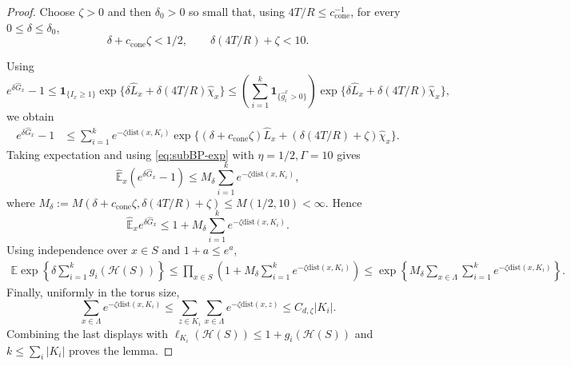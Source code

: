 \documentclass[letterpaper,11pt,reqno]{amsart}
\theoremstyle{definition}
\newcommand{\dist}{\mathrm{dist}}
\begin{document}
\begin{proof}
Choose \(\zeta>0\) and then \(\delta_0>0\) so small that, using
\(4T/R\le c_{\mathrm{cone}}^{-1}\), for every
\(0\le\delta\le\delta_0\),
\[
        \delta+c_{\mathrm{cone}}\zeta<1/2,
        \qquad
        \delta(4T/R)+\zeta<10 .
\]

Using
\[
        e^{\delta\widehat G_x}-1
        \le
        \mathbf 1_{\{I_x\ge1\}}
        \exp\{\delta\widehat L_x+\delta(4T/R)\widehat\chi_x\}
        \le
        \left(\sum_{i=1}^{k}\mathbf  1_{\{\widehat g_i^x>0\}}\right)
        \exp\{\delta\widehat L_x+\delta(4T/R)\widehat\chi_x\},
\]
we obtain
\[
\begin{aligned}
        e^{\delta\widehat G_x}-1
        &\le
        \sum_{i=1}^k
        e^{-\zeta\dist(x,K_i)}
        \exp\{(\delta+c_{\mathrm{cone}}\zeta)\widehat L_x
        +(\delta(4T/R)+\zeta)\widehat\chi_x\}.
\end{aligned}
\]
Taking expectation and using \eqref{eq:subBP-exp} with
\(\eta=1/2,\Gamma=10\) gives
\[
        \widehat{\mathbb E}_x(e^{\delta\widehat G_x}-1)
        \le
        M_\delta\sum_{i=1}^k e^{-\zeta\dist(x,K_i)},
\]
where $M_\delta
        :=
        M(\delta+c_{\mathrm{cone}}\zeta,\delta(4T/R)+\zeta)
        \leq M(1/2,10)<\infty$.
Hence
\[
        \widehat{\mathbb E}_x e^{\delta\widehat G_x}
        \le
        1+
        M_\delta\sum_{i=1}^k e^{-\zeta\dist(x,K_i)}.
\]
Using independence over \(x\in S\) and \(1+a\le e^a\),
\[
\begin{aligned}
        \mathbb E
        \exp\left\{
        \delta\sum_{i=1}^k g_i(\mathcal H(S))
        \right\}
        \le
        \prod_{x\in S}
        \left(
        1+M_\delta\sum_{i=1}^k e^{-\zeta\dist(x,K_i)}
        \right)                           \le
        \exp\left\{
        M_\delta\sum_{x\in\Lambda}\sum_{i=1}^k
        e^{-\zeta\dist(x,K_i)}
        \right\}.
\end{aligned}
\]
Finally, uniformly in the torus size,
\[
        \sum_{x\in\Lambda}e^{-\zeta\dist(x,K_i)}
        \le
        \sum_{z\in K_i}\sum_{x\in\Lambda}e^{-\zeta\dist(x,z)}
        \le
        C_{d,\zeta}|K_i|.
\]
Combining the last displays with
\(\ell_{K_i}(\mathcal H(S))\le1+g_i(\mathcal H(S))\) and
\(k\le\sum_i |K_i|\) proves the lemma.
\end{proof}
\end{document}
